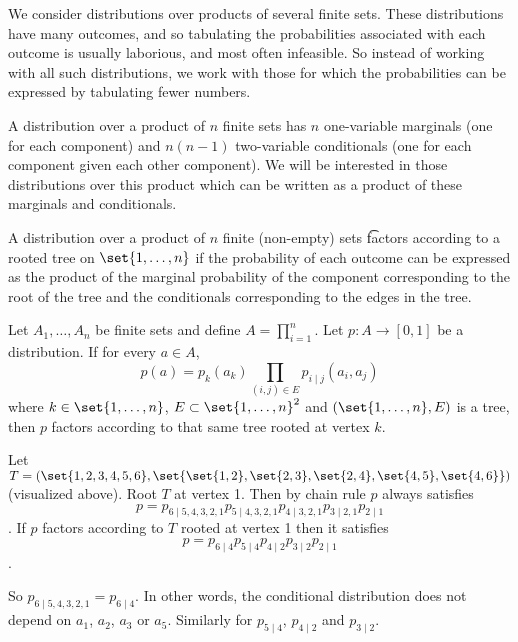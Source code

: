 

We consider distributions over products of several finite sets.
These distributions have many outcomes, and so tabulating the probabilities associated with each outcome is usually laborious, and most often infeasible.
So instead of working with all such distributions, we work with those for which the probabilities can be expressed by tabulating fewer numbers.


A distribution over a product of $n$ finite sets has $n$ one-variable marginals (one for each component) and $n(n-1)$ two-variable conditionals (one for each component given each other component).
We will be interested in those distributions over this product which can be written as a product of these marginals and conditionals.

A distribution over a product of $n$ finite (non-empty) sets \t{factors according to a rooted tree} on $\set{1, \dots, n}$ if the probability of each outcome can be expressed as the product of the marginal probability of the component corresponding to the root of the tree and the conditionals corresponding to the edges in the tree.


Let $A_1, \dots, A_n$ be finite sets and define $A = \prod_{i = 1}^{n}$.
Let $p: A \to [0, 1]$ be a distribution.
If for every $a \in A$, $$p(a) = p_k(a_k)\prod_{(i, j) \in E} p_{i \mid j}(a_i, a_j)$$ where $k \in \set{1, \dots, n}$, $E \subset \set{1, \dots, n}^2$ and $(\set{1, \dots, n}, E)$ is a tree, then $p$ factors according to that same tree rooted at vertex $k$.



Let $T = (\set{1, 2, 3, 4, 5, 6}, \set{\set{1, 2}, \set{2, 3}, \set{2, 4}, \set{4, 5}, \set{4, 6}})$ (visualized above). Root $T$ at vertex 1.
Then by chain rule $p$ always satisfies $$p = p_{6 \mid 5, 4, 3, 2, 1}p_{5 \mid 4, 3, 2, 1}p_{4 \mid 3, 2, 1} p_{3 \mid 2, 1}p_{2 \mid 1}$$.
If $p$ factors according to $T$ rooted at vertex 1 then it satisfies $$p = p_{6 \mid 4}p_{5 \mid 4}p_{4 \mid 2}p_{3 \mid 2}p_{2 \mid 1}$$.

So $p_{6 \mid 5, 4, 3, 2, 1} = p_{6 \mid 4}$. In other words, the conditional distribution does not depend on $a_1$, $a_2$, $a_3$ or $a_5$. Similarly for $p_{5 \mid 4}$, $p_{4 \mid 2}$ and $p_{3 \mid 2}$.

